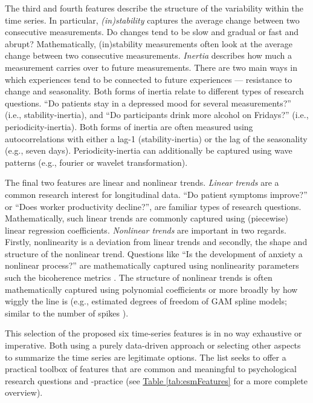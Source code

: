 \documentclass[man, 12pt, a4paper, mask, floatsintext]{apa7}
\theoremstyle{break}
\theoremstyle{plain}
\newcommand{\tblref}[2][]{\hyperref[#2]{Table \ref*{#2}#1}}
\begin{document}
The third and fourth features describe the structure of the variability within the time series. In particular, \textit{(in)stability} captures the average change between two consecutive measurements. Do changes tend to be slow and gradual or fast and abrupt? Mathematically, (in)stability measurements often look at the average change between two consecutive measurements. \textit{Inertia} describes how much a measurement carries over to future measurements. There are two main ways in which experiences tend to be connected to future experiences --- resistance to change and seasonality. Both forms of inertia relate to different types of research questions. ``Do patients stay in a depressed mood for several measurements?'' (i.e., stability-inertia), and ``Do participants drink more alcohol on Fridays?'' (i.e., periodicity-inertia). Both forms of inertia are often measured using autocorrelations with either a lag-1 (stability-inertia) or the lag of the seasonality (e.g., seven days). Periodicity-inertia can additionally be captured using wave patterns (e.g., fourier or wavelet transformation).

The final two features are linear and nonlinear trends. \textit{Linear trends} are a common research interest for longitudinal data. ``Do patient symptoms improve?'' or ``Does worker productivity decline?'', are familiar types of research questions. Mathematically, such linear trends are commonly captured using (piecewise) linear regression coefficients. \textit{Nonlinear trends} are important in two regards. Firstly, nonlinearity is a deviation from linear trends and secondly, the shape and structure of the nonlinear trend. Questions like ``Is the development of anxiety a nonlinear process?'' are mathematically captured using nonlinearity parameters such the bicoherence metrics \citep{cuddy2009}. The structure of nonlinear trends is often mathematically captured using polynomial coefficients or more broadly by how wiggly the line is (e.g., estimated degrees of freedom of GAM spline models; similar to the number of spikes \citealp[]{caro-martin2018}). 

This selection of the proposed six time-series features is in no way exhaustive or imperative. Both using a purely data-driven approach or selecting other aspects to summarize the time series are legitimate options. The list seeks to offer a practical toolbox of features that are common and meaningful to psychological research questions and -practice (see \tblref{tab:esmFeatures} for a more complete overview).
\end{document}
